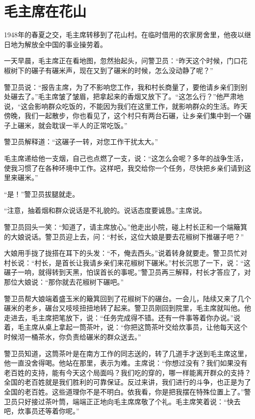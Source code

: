 \documentclass[12pt,UTF-8,openany]{ctexbook}
\begin{document}
\chapter{毛主席在花山}

\begin{large}
    
    1948年的春夏之交，毛主席转移到了花山村。在临时借用的农家房舍里，他夜以继日地为解放全中国的事业操劳着。
    
    一天早晨，毛主席正在看地图，忽然抬起头，问警卫员：“昨天这个时候，门口花椒树下的碾子有碾米声，现在又到了碾米的时候，怎么没动静了呢？”
    
    警卫员说：“报告主席，为了不影响您工作，我和村长商量了，要他请乡亲们到别处碾去了。”毛主席皱了皱眉，把拿起来的香烟又放下了。“这怎么行？”他严肃地说，“这会影响群众吃饭的，不能因为我们在这里工作，就影响群众的生活。昨天傍晚，我们一起散步，你也看见了，这个村只有两台石碾，让乡亲们集中到一个碾子上碾米，就会耽误一半人的正常吃饭。”
    
    警卫员解释道：“这碾子一转，对您工作干扰太大。”
    
    毛主席递给他一支烟，自己也点燃了一支，说：“这怎么会呢？多年的战争生活，使我习惯了在各种环境中工作。这样吧，我交给你一个任务，尽快把乡亲们请到这里来碾米。”
    
    “是！”警卫员拔腿就走。
    
    “注意，抽着烟和群众说话是不礼貌的。说话态度要诚恳。”主席说。
    
    警卫员回头一笑：“知道了，请主席放心。”他走出小院，碰上村长正和一个端簸箕的大娘说话。警卫员迎上去，问：“村长，这位大娘是要去花椒树下推碾子吧？”
    
    大娘用手拢了拢搭在耳下的头发：“不，俺去西头。”说着转身就要走。警卫员忙对村长说：“村长，是首长让我请乡亲们来花椒树下碾米。”村长沉思了一下，说：“这碾子一响，就得转到天黑，怕误首长的事呢。”警卫员再三解释，村长才答应了，对那位大娘说：“那你就去花椒树下碾吧。”
    
    警卫员帮大娘端着盛玉米的簸箕回到了花椒树下的碾台。一会儿，陆续又来了几个碾米的老乡，碾台又吱吱扭扭地转了起来。警卫员刚回到院里，毛主席就叫他。他走进去，毛主席把笔放下，说：“任务完成得不错。还有一件事等着你办说。”说着，毛主席从桌上拿起一筒茶叶，说：“你把这筒茶叶交给炊事员，让他每天这个时候沏一桶茶水，你负责给碾米的群众送去。”
    
    警卫员知道，这筒茶叶是在南方工作的同志送的，转了几道手才送到毛主席这里，他一直没舍得喝。他站在那里，表示为难。主席说：“你想过没有？我们如果没有老百姓的支持，能有今天这个局面吗？我们吃的穿的，哪一样能离开群众的支持？全国的老百姓就是我们胜利的可靠保证。反过来讲，我们进行的斗争，也正是为了全国的老百姓。这些道理你不是不明白。依我看，你是把我摆在特殊位置上了。”警卫员只好接过茶叶筒，端端正正地向毛主席席敬了个礼。毛主席笑着说：“快去吧，炊事员还等着你呢。”
    

\end{large}
\end{document}
